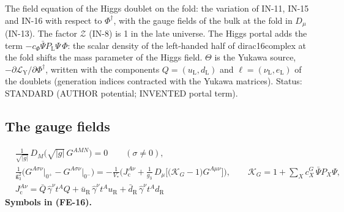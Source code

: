 \documentclass[
  10pt,
]{article}
\begin{document}
The field equation of the Higgs doublet on the fold: the variation of
IN-11, IN-15 and IN-16 with respect to \(\Phi^\dagger\), with the gauge
fields of the bulk at the fold in \(D_\mu\) (IN-13). The factor
\(\mathcal{Z}\) (IN-8) is 1 in the late universe. The Higgs portal adds
the term \(-c_\Phi\bar\Psi P_{\mathrm{L}}\Psi\,\Phi\): the scalar
density of the left-handed half of dirac16complex at the fold shifts the
mass parameter of the Higgs field. \(\Theta\) is the Yukawa source,
\(-\partial\mathcal{L}_{\mathrm{Y}}/\partial\Phi^\dagger\), written with
the components \(Q = (u_{\mathrm{L}}, d_{\mathrm{L}})\) and
\(\ell = (\nu_{\mathrm{L}}, e_{\mathrm{L}})\) of the doublets
(generation indices contracted with the Yukawa matrices). Status:
STANDARD (AUTHOR potential; INVENTED portal term).

\hypertarget{the-gauge-fields}{%
\subsection{The gauge fields}\label{the-gauge-fields}}

\[
\begin{aligned}
&\frac{1}{\sqrt{\lvert g\rvert}}\,D_M\big(\sqrt{\lvert g\rvert}\,G^{AMN}\big) = 0\qquad (\sigma \ne 0),\\
&\frac{1}{\mathsf{g}_3^2}\Big(G^{A\sigma\nu}\big\vert_{0^+} - G^{A\sigma\nu}\big\vert_{0^-}\Big)
 = -\frac{1}{V_*}\Big(J_{\mathrm{c}}^{A\nu} + \frac{1}{g_3}\,D_\mu\big[\big(\mathcal{K}_{G} - 1\big)G^{A\mu\nu}\big]\Big),\qquad
 \mathcal{K}_{G} = 1 + \sum_X c^{G}_X\,\bar\Psi P_X\Psi,\\
&J_{\mathrm{c}}^{A\nu} = \bar Q\,\hat\gamma^\nu t^AQ + \bar u_{\mathrm{R}}\,\hat\gamma^\nu t^Au_{\mathrm{R}}
 + \bar d_{\mathrm{R}}\,\hat\gamma^\nu t^Ad_{\mathrm{R}}
\end{aligned} \tag{FE-16}
\] \textbf{Symbols in (FE-16).}
\end{document}
